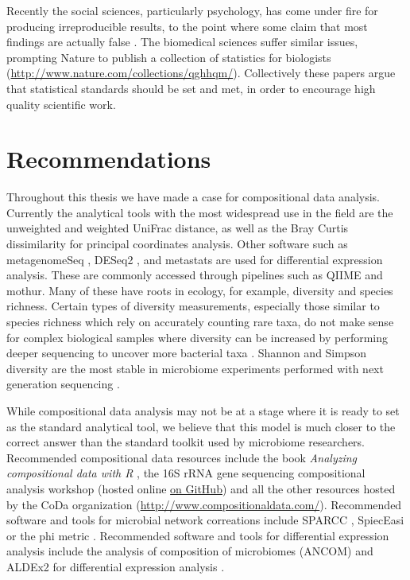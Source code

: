 Recently the social sciences, particularly psychology, has come under fire for producing irreproducible results, to the point where some claim that most findings are actually false \cite{ioannidis2005most}. The biomedical sciences suffer similar issues, prompting Nature to publish a collection of statistics for biologists (\url{http://www.nature.com/collections/qghhqm/}). Collectively these papers argue that statistical standards should be set and met, in order to encourage high quality scientific work.

\section{Recommendations}
Throughout this thesis we have made a case for compositional data analysis. Currently the analytical tools with the most widespread use in the field are the unweighted and weighted UniFrac distance, as well as the Bray Curtis dissimilarity for principal coordinates analysis. Other software such as metagenomeSeq \cite{paulson2014metagenomeseq}, DESeq2 \cite{love2014moderated}, and metastats \cite{paulson2011metastats} are used for differential expression analysis. These are commonly accessed through pipelines such as QIIME and mothur. Many of these have roots in ecology, for example, diversity and species richness. Certain types of diversity measurements, especially those similar to species richness which rely on accurately counting rare taxa, do not make sense for complex biological samples where diversity can be increased by performing deeper sequencing to uncover more bacterial taxa \cite{haegeman2013robust}. Shannon and Simpson diversity are the most stable in microbiome experiments performed with next generation sequencing \cite{haegeman2013robust}.

While compositional data analysis may not be at a stage where it is ready to set as the standard analytical tool, we believe that this model is much closer to the correct answer than the standard toolkit used by microbiome researchers. Recommended compositional data resources include the book \textit{Analyzing compositional data with R} \cite{van2013analyzing}, the 16S rRNA gene sequencing compositional analysis workshop (hosted online \href{https://github.com/ggloor/compositions/blob/master/background_reading/CJM_supplement/workshop.pdf}{on GitHub}) and all the other resources hosted by the CoDa organization (\url{http://www.compositionaldata.com/}). Recommended software and tools for microbial network correations include SPARCC \cite{friedman2012inferring}, SpiecEasi \cite{kurtz2015sparse} or the phi metric \cite{lovell2015proportionality}. Recommended software and tools for differential expression analysis include the analysis of composition of microbiomes (ANCOM) \cite{mandal2015analysis} and ALDEx2 for differential expression analysis \cite{fernandes2014unifying}.


